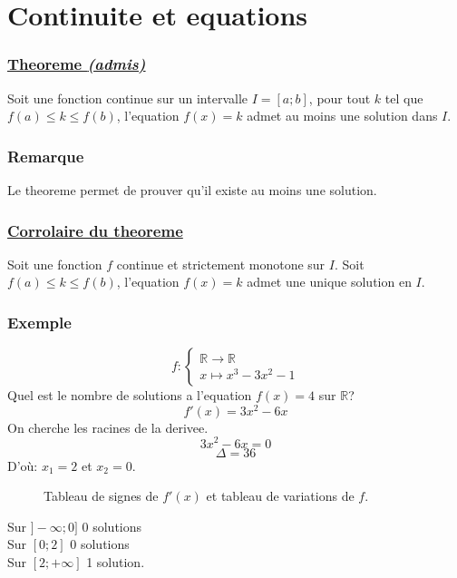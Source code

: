 \documentclass{article}
\begin{document}
\section{Continuite et equations}
\begin{defbox}
	\sloppy
	\subsubsection*{\underline{Theoreme \textit{(admis)}}}
	Soit une fonction continue sur un intervalle $I = [a;b]$, pour tout $k$ tel que\\ $f(a) \leq k \leq f(b)$, l'equation $f(x) = k$ admet au moins une solution dans $I$.
	\\
	\subsubsection*{Remarque}
	Le theoreme permet de prouver qu'il existe au moins une solution.
	\\
	\subsubsection*{\underline{Corrolaire du theoreme}}
	Soit une fonction $f$ continue et strictement monotone sur $I$. Soit $f(a)\leq k \leq f(b)$, l'equation $f(x) = k$ admet une unique solution en $I$.
\end{defbox}
\subsubsection*{Exemple}
$$f: \begin{cases}
	\mathbb{R} \to \mathbb{R}\\
	x \mapsto x^3-3x^2 -1
\end{cases}$$
Quel est le nombre de solutions a l'equation $f(x)=4$ sur $\mathbb{R}$?
$$f'(x)=3x^2-6x$$
On cherche les racines de la derivee.
$$3x^2-6x=0$$
$$\Delta = 36$$
D'où: $x_1 = 2$ et $x_2 = 0$.

\begin{figure}[H]
	\centering
	\caption{Tableau de signes de $f'(x)$ et tableau de variations de $f$.}
\end{figure}
Sur $]-\infty;0]$ 0 solutions\\
\indent Sur $[0;2]$ 0 solutions\\
\indent Sur $[2;+\infty]$ 1 solution.
\end{document}
